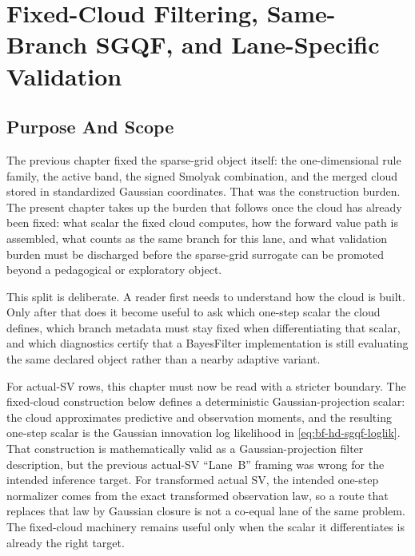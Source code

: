 \chapter{Fixed-Cloud Filtering, Same-Branch SGQF, and Lane-Specific Validation}
\label{ch:bf-highdim-fixed-cloud-sgqf-validation}
\providecommand{\widehatell}{\widehat{\ell}}
\providecommand{\dotwidehatell}{\dot{\widehat{\ell}}}
\providecommand{\dd}{\,\mathrm d}

\section{Purpose And Scope}
\label{sec:bf-hd-sgqf-validation-purpose}

The previous chapter fixed the sparse-grid object itself: the one-dimensional
rule family, the active band, the signed Smolyak combination, and the merged
cloud stored in standardized Gaussian coordinates.  That was the construction
burden.  The present chapter takes up the burden that follows once the cloud has
already been fixed: what scalar the fixed cloud computes, how the forward value
path is assembled, what counts as the same branch for this lane, and what
validation burden must be discharged before the sparse-grid surrogate can be
promoted beyond a pedagogical or exploratory object.

This split is deliberate.  A reader first needs to understand how the cloud is
built.  Only after that does it become useful to ask which one-step scalar the
cloud defines, which branch metadata must stay fixed when differentiating that
scalar, and which diagnostics certify that a BayesFilter implementation is still
evaluating the same declared object rather than a nearby adaptive variant.

For actual-SV rows, this chapter must now be read with a stricter boundary.
The fixed-cloud construction below defines a deterministic Gaussian-projection
scalar: the cloud approximates predictive and observation moments, and the
resulting one-step scalar is the Gaussian innovation log likelihood in
\eqref{eq:bf-hd-sgqf-loglik}.  That construction is mathematically valid as a
Gaussian-projection filter description, but the previous actual-SV ``Lane~B''
framing was wrong for the intended inference target.  For transformed actual SV,
the intended one-step normalizer comes from the exact transformed observation law,
so a route that replaces that law by Gaussian closure is not a co-equal lane of
the same problem.  The fixed-cloud machinery remains useful only when the scalar
it differentiates is already the right target.

